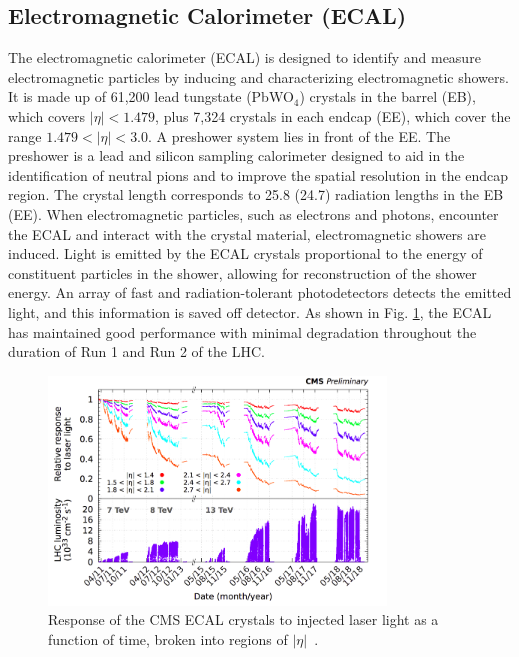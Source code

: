 \subsection{Electromagnetic Calorimeter (ECAL)}
The electromagnetic calorimeter (ECAL) is designed to identify and measure electromagnetic particles by inducing and characterizing electromagnetic showers. 
It is made up of 61,200 lead tungstate (PbWO$_4$) crystals in the barrel (EB), which covers $|\eta| < 1.479$, plus 7,324 crystals in each endcap (EE), which cover the range $1.479 < |\eta| < 3.0$. A preshower system lies in front of the EE. The preshower is a lead and silicon sampling calorimeter designed to aid in the identification of neutral pions and to improve the spatial resolution in the 
endcap region. 
The crystal length corresponds to 25.8 (24.7) radiation lengths in the EB (EE). When electromagnetic particles, such as 
electrons and photons, encounter the ECAL and interact with the crystal material, electromagnetic showers are induced. 
Light is emitted by the ECAL crystals proportional to the energy of constituent particles in the shower, allowing 
for reconstruction of the shower energy. An array of fast and radiation-tolerant photodetectors detects the emitted light, and this information is saved off detector. 
As shown in Fig. \ref{fig:cms_ecal_response}, the ECAL has maintained good performance with minimal degradation throughout the duration of Run 1 and Run 2 of the LHC.

\begin{figure}[tb]
  \centering
   \includegraphics[width=0.8\textwidth]{fig/experiment/detector/cms_ecal_response.png}
	\caption[Response of the CMS ECAL crystals to injected laser light as a function of time, broken into regions of $|\eta|$.]
	{Response of the CMS ECAL crystals to injected laser light as a function of time, broken into regions of $|\eta|$~\cite{Cavallari:2798128}.}
	\label{fig:cms_ecal_response}
\end{figure}

